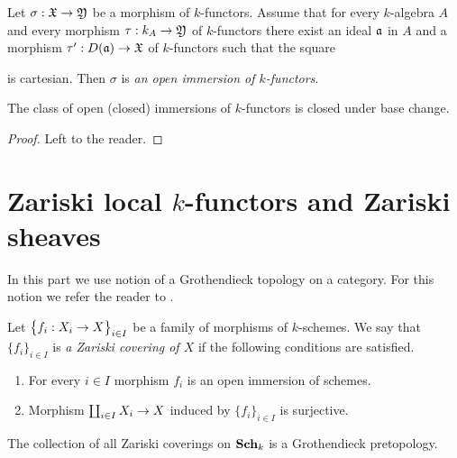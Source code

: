 \begin{definition}
Let $\sigma:{\mathfrak X}\rightarrow {\mathfrak Y}$ be a morphism of $k$-functors. Assume that for every $k$-algebra $A$ and every morphism $\tau:k_A\rightarrow {\mathfrak Y}$ of $k$-functors there exist an ideal $\mathfrak{a}$ in $A$ and a morphism $\tau':D(\mathfrak{a})\rightarrow {\mathfrak X}$ of $k$-functors such that the square
\begin{center}
\end{center}
is cartesian. Then $\sigma$ is \textit{an open immersion of $k$-functors}.
\end{definition}

\begin{fact}\label{fact:openclosedimmersionsclosedunderbasechange}
The class of open (closed) immersions of $k$-functors is closed under base change.
\end{fact}
\begin{proof}
Left to the reader.
\end{proof}

\section{Zariski local $k$-functors and Zariski sheaves}
\noindent
In this part we use notion of a Grothendieck topology on a category. For this notion we refer the reader to \cite{Sheaves}.

\begin{definition}
Let $\big\{f_i:X_i\rightarrow X\big\}_{i\in I}$ be a family of morphisms of $k$-schemes. We say that $\{f_i\}_{i\in I}$ is \textit{a Zariski covering of $X$} if the following conditions are satisfied.
\begin{enumerate}[label=\textbf{(\arabic*)}, leftmargin=1.5em]
\item For every $i\in I$ morphism $f_i$ is an open immersion of schemes.
\item Morphism $\coprod_{i\in I}X_i\rightarrow X$ induced by $\big\{f_i\big\}_{i\in I}$ is surjective.
\end{enumerate}
\end{definition}
\noindent
The collection of all Zariski coverings on $\mathbf{Sch}_k$ is a Grothendieck pretopology.

